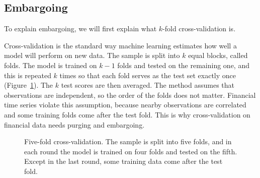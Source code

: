 \subsection{Embargoing} 

To explain embargoing, we will first explain what $k$-fold cross-validation is. 



Cross-validation is the standard way machine learning estimates how well a model will perform on new data. The sample is split into $k$ equal blocks, called folds. The model is trained on $k-1$ folds and tested on the remaining one, and this is repeated $k$ times so that each fold serves as the test set exactly once (Figure~\ref{fig:05-kfold}). The $k$ test scores are then averaged. The method assumes that observations are independent, so the order of the folds does not matter. Financial time series violate this assumption, because nearby observations are correlated and some training folds come after the test fold. This is why cross-validation on financial data needs purging and embargoing.

\begin{figure}[htbp]
  \centering
  \caption{Five-fold cross-validation. The sample is split into five folds, and
    in each round the model is trained on four folds and tested on the fifth.
    Except in the last round, some training data come after the test fold.}
  \label{fig:05-kfold}
\end{figure}

